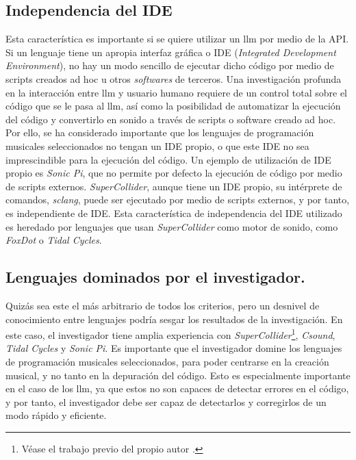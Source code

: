 \subsection{Independencia del IDE}
Esta característica es importante si se quiere utilizar un \gls{llm} por medio de la API. Si un lenguaje tiene un apropia interfaz gráfica o IDE (\textit{Integrated Development Environment}), no hay un modo sencillo de ejecutar dicho código por medio de scripts creados ad hoc u otros \textit{softwares} de terceros. Una investigación profunda en la interacción entre \gls{llm} y usuario humano requiere de un control total sobre el código que se le pasa al \gls{llm}, así como la posibilidad de automatizar la ejecución del código y convertirlo en sonido a través de scripts o software creado ad hoc. Por ello, se ha considerado importante que los lenguajes de programación musicales seleccionados no tengan un IDE propio, o que este IDE no sea imprescindible para la ejecución del código. Un ejemplo de utilización de IDE propio es \textit{Sonic Pi}, que no permite por defecto la ejecución de código por medio de scripts externos. \textit{SuperCollider}, aunque tiene un IDE propio, su intérprete de comandos, \textit{sclang}, puede ser ejecutado por medio de scripts externos, y por tanto, es independiente de IDE. Esta característica de independencia del IDE utilizado es heredado por lenguajes que usan \textit{SuperCollider} como motor de sonido, como \textit{FoxDot} o \textit{Tidal Cycles}.

\subsection{Lenguajes dominados por el investigador.} 
Quizás sea este el más arbitrario de todos los criterios, pero un desnivel de conocimiento entre lenguajes podría sesgar los resultados de la investigación. En este caso, el investigador tiene amplia experiencia con \textit{SuperCollider}\footnote{Véase el trabajo previo del propio autor \citep{guerraparraMesjetiuTFM_Arte_Sonoro_MEMORIA2020}.}, \textit{Csound}, \textit{Tidal Cycles} y \textit{Sonic Pi}.
Es importante que el investigador domine los lenguajes de programación musicales seleccionados, para poder centrarse en la creación musical, y no tanto en la depuración del código. Esto es especialmente importante en el caso de los \gls{llm}, ya que estos no son capaces de detectar errores en el código, y por tanto, el investigador debe ser capaz de detectarlos y corregirlos de un modo rápido y eficiente.

